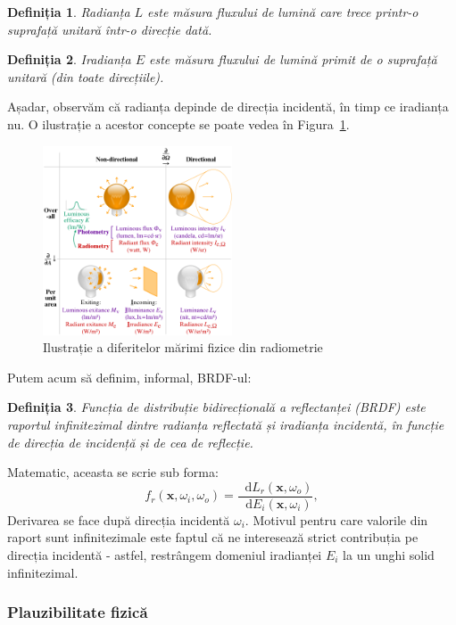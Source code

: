 \documentclass[12pt,a4paper]{report}
\newcommand*\diff{\mathop{}\!\mathrm{d}}
\newtheorem{definition}{Definiția}
\numberwithin{equation}{section} %
\begin{document}
\begin{definition}
	Radianța $L$ este măsura fluxului de lumină care trece printr-o suprafață unitară într-o direcție dată.
\end{definition}
\begin{definition}
	Iradianța $E$ este măsura fluxului de lumină primit de o suprafață unitară (din toate direcțiile).
\end{definition}

Așadar, observăm că radianța depinde de direcția incidentă, în timp ce iradianța
nu. O ilustrație a acestor concepte se poate vedea în Figura~\ref{fig:radiance}.
\begin{figure}[ht]
	\centering
	\includegraphics[width=0.5\textwidth]{pics/radiometry.png}
	\caption{Ilustrație a diferitelor mărimi fizice din radiometrie\protect{}}
	\label{fig:radiance}
\end{figure}

Putem acum să definim, informal, BRDF-ul:
\begin{definition}
	Funcția de distribuție bidirecțională a reflectanței (BRDF) este raportul infinitezimal
	dintre radianța reflectată și iradianța incidentă, în funcție de direcția de incidență și de cea de reflecție.
\end{definition}
Matematic, aceasta se scrie sub forma:
\begin{equation}
	f_r(\mathbf{x}, \omega_i, \omega_o) = \frac{\diff L_r(\mathbf{x}, \omega_o)}{\diff E_i(\mathbf{x}, \omega_i)},
\end{equation}
Derivarea se face după direcția incidentă $\omega_i$. Motivul pentru care valorile din
raport sunt infinitezimale este faptul că ne interesează strict contribuția pe direcția
incidentă - astfel, restrângem domeniul iradianței $E_i$ la un unghi solid infinitezimal.

\subsubsection*{Plauzibilitate fizică}
\end{document}
